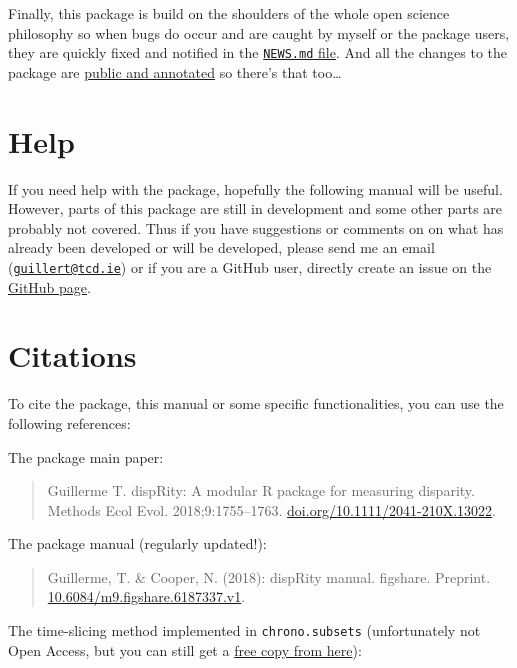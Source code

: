 \documentclass[]{book}
\begin{document}
Finally, this package is build on the shoulders of the whole open science philosophy so when bugs do occur and are caught by myself or the package users, they are quickly fixed and notified in the \href{https://github.com/TGuillerme/dispRity/blob/master/NEWS.md}{\texttt{NEWS.md} file}. And all the changes to the package are \href{https://github.com/TGuillerme/dispRity/commits/master}{public and annotated} so there's that too\ldots{}

\hypertarget{help}{%
\section{Help}\label{help}}

If you need help with the package, hopefully the following manual will be useful.
However, parts of this package are still in development and some other parts are probably not covered.
Thus if you have suggestions or comments on on what has already been developed or will be developed, please send me an email (\href{mailto:guillert@tcd.ie}{\nolinkurl{guillert@tcd.ie}}) or if you are a GitHub user, directly create an issue on the \href{https://github.com/TGuillerme/dispRity}{GitHub page}.

\hypertarget{citations}{%
\section{Citations}\label{citations}}

To cite the package, this manual or some specific functionalities, you can use the following references:

The package main paper:

\begin{quote}
Guillerme T. dispRity: A modular R package for measuring disparity. Methods Ecol Evol. 2018;9:1755--1763. \href{https://doi.org/10.1111/2041-210X.13022}{doi.org/10.1111/2041-210X.13022}.
\end{quote}

The package manual (regularly updated!):

\begin{quote}
Guillerme, T. \& Cooper, N. (2018): dispRity manual. figshare. Preprint. \href{https://doi.org/10.6084/m9.figshare.6187337.v1}{10.6084/m9.figshare.6187337.v1}.
\end{quote}

The time-slicing method implemented in \texttt{chrono.subsets} (unfortunately not Open Access, but you can still get a \href{https://tguillerme.github.io/papers/Guillerme\&Cooper-2018-Palaeontology.pdf}{free copy from here}):
\end{document}
